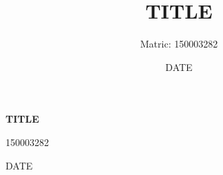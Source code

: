 \documentclass[a4paper,12pt]{report}
\title{TITLE}
\author{Matric: 150003282}
\date{DATE}
\begin{document}
	\begin{titlepage}
        \centering
        {\huge\bfseries TITLE \par}
        \vspace{1.5cm}
        {\Large 150003282 \par}
        \vspace{0.5cm}
        {\large DATE \par}
        \vspace{0.5cm}
    \end{titlepage}

    \pagebreak



	
	




	
	\pagebreak

   

\end{document}
